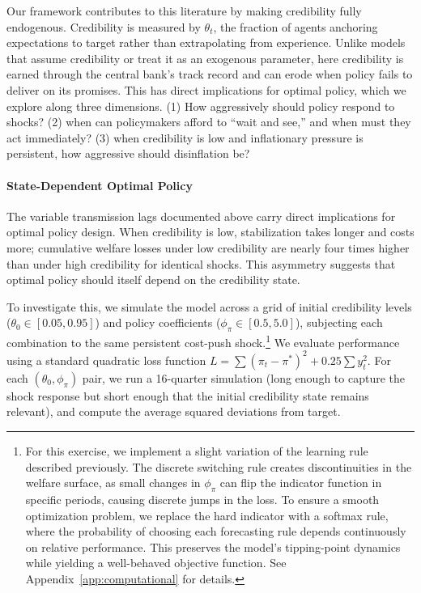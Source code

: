 \documentclass[10pt]{article}
\begin{document}
Our framework contributes to this literature by making credibility fully endogenous. Credibility is measured by $\theta_t$, the fraction of agents anchoring expectations to target rather than extrapolating from experience. Unlike models that assume credibility or treat it as an exogenous parameter, here credibility is earned through the central bank's track record and can erode when policy fails to deliver on its promises. This has direct implications for optimal policy, which we explore along three dimensions. (1) How aggressively should policy respond to shocks? (2) when can policymakers afford to ``wait and see,'' and when must they act immediately? (3) when credibility is low and inflationary pressure is persistent, how aggressive should disinflation be?

\paragraph{State-Dependent Optimal Policy}

The variable transmission lags documented above carry direct implications for optimal policy design. When credibility is low, stabilization takes longer and costs more; cumulative welfare losses under low credibility are nearly four times higher than under high credibility for identical shocks. This asymmetry suggests that optimal policy should itself depend on the credibility state.

To investigate this, we simulate the model across a grid of initial credibility levels ($\theta_0 \in [0.05, 0.95]$) and policy coefficients ($\phi_\pi \in [0.5, 5.0]$), subjecting each combination to the same persistent cost-push shock.\footnote{For this exercise, we implement a slight variation of the learning rule described previously. The discrete switching rule creates discontinuities in the welfare surface, as small changes in $\phi_\pi$ can flip the indicator function in specific periods, causing discrete jumps in the loss. To ensure a smooth optimization problem, we replace the hard indicator with a softmax rule, where the probability of choosing each forecasting rule depends continuously on relative performance. This preserves the model's tipping-point dynamics while yielding a well-behaved objective function. See Appendix~\ref{app:computational} for details.} We evaluate performance using a standard quadratic loss function $L = \sum (\pi_t - \pi^*)^2 + 0.25 \sum y_t^2$. For each $(\theta_0, \phi_\pi)$ pair, we run a 16-quarter simulation (long enough to capture the shock response but short enough that the initial credibility state remains relevant), and compute the average squared deviations from target.
\end{document}
